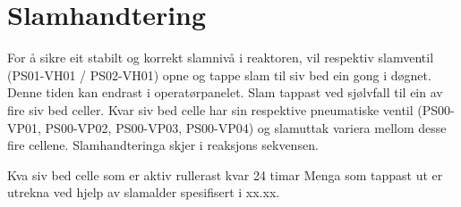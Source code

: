 \newpage
\section{Slamhandtering}
For å sikre eit stabilt og korrekt slamnivå i reaktoren, vil respektiv slamventil (PS01-VH01 / PS02-VH01) opne og tappe slam til siv bed ein gong i døgnet.
 Denne tiden kan endrast i operatørpanelet. Slam tappast ved sjølvfall til ein av fire siv bed celler. 
 Kvar siv bed celle har sin respektive pneumatiske ventil (PS00-VP01, PS00-VP02, PS00-VP03, PS00-VP04) og slamuttak variera mellom desse fire cellene. Slamhandteringa skjer i reaksjons sekvensen.

Kva siv bed celle som er aktiv rullerast kvar 24 timar
Menga som tappast ut er utrekna ved hjelp av slamalder spesifisert i xx.xx.
